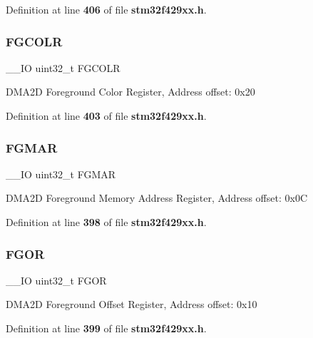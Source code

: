 Definition at line \textbf{ 406} of file \textbf{ stm32f429xx.\+h}.

\mbox{\label{structDMA2D__TypeDef_a3b7bcbbdcd4f728861babc3300a26f61}} 
\subsubsection{F\+G\+C\+O\+LR}
{\footnotesize\ttfamily \+\_\+\+\_\+\+IO uint32\+\_\+t F\+G\+C\+O\+LR}

D\+M\+A2D Foreground Color Register, Address offset\+: 0x20 

Definition at line \textbf{ 403} of file \textbf{ stm32f429xx.\+h}.

\mbox{\label{structDMA2D__TypeDef_a17e8aa3d2c6464eba518c8ccf28c173d}} 
\subsubsection{F\+G\+M\+AR}
{\footnotesize\ttfamily \+\_\+\+\_\+\+IO uint32\+\_\+t F\+G\+M\+AR}

D\+M\+A2D Foreground Memory Address Register, Address offset\+: 0x0C 

Definition at line \textbf{ 398} of file \textbf{ stm32f429xx.\+h}.

\mbox{\label{structDMA2D__TypeDef_af3d84e911bbb2bf8cfa6d5e1dfe01afe}} 
\subsubsection{F\+G\+OR}
{\footnotesize\ttfamily \+\_\+\+\_\+\+IO uint32\+\_\+t F\+G\+OR}

D\+M\+A2D Foreground Offset Register, Address offset\+: 0x10 

Definition at line \textbf{ 399} of file \textbf{ stm32f429xx.\+h}.

\mbox{\label{structDMA2D__TypeDef_add402fd3aa4845802f08f8df79a5a72a}} 
